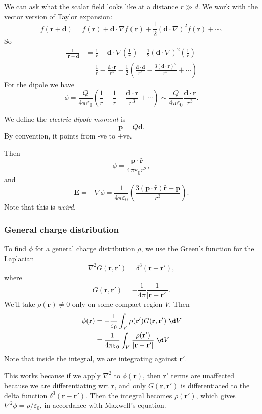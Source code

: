 \documentclass[a4paper]{article}
\begin{document}
We can ask what the scalar field looks like at a distance $r \gg d$. We work with the vector version of Taylor expansion:
\[
  f(\mathbf{r} + \mathbf{d}) = f(\mathbf{r}) + \mathbf{d}\cdot \nabla f(\mathbf{r}) + \frac{1}{2}(\mathbf{d}\cdot \nabla)^2f(\mathbf{r}) + \cdots.
\]
So
\begin{align*}
  \frac{1}{|\mathbf{r} + \mathbf{d}} &= \frac{1}{r} - \mathbf{d}\cdot \nabla\left(\frac{1}{r}\right) + \frac{1}{2}(\mathbf{d}\cdot \nabla)^2\left(\frac{1}{r}\right)\\
  &= \frac{1}{r} - \frac{\mathbf{d}\cdot \mathbf{r}}{r^3} - \frac{1}{2}\left(\frac{\mathbf{d}\cdot \mathbf{d}}{r^3} - \frac{3(\mathbf{d}\cdot \mathbf{r})^2}{r^5} + \cdots\right)
\end{align*}
For the dipole we have
\[
  \phi = \frac{Q}{4\pi\varepsilon_0}\left(\frac{1}{r} - \frac{1}{r} + \frac{\mathbf{d}\cdot \mathbf{r}}{r^3} + \cdots\right) \sim \frac{Q}{4\pi\varepsilon_0} \frac{\mathbf{d}\cdot \mathbf{r}}{r^3}.
\]
\begin{defi}
  We define the \emph{electric dipole moment} is
  \[
    \mathbf{p} = Q\mathbf{d}.
  \]
  By convention, it points from -ve to +ve.
\end{defi}
Then
\[
  \phi = \frac{\mathbf{p}\cdot \hat{\mathbf{r}}}{4\pi\varepsilon_0 r^2},
\]
and
\[
  \mathbf{E} = -\nabla\phi = \frac{1}{4\pi\varepsilon_0}\left(\frac{3(\mathbf{p}\cdot\hat{\mathbf{r}})\hat{\mathbf{r}} - \mathbf{p}}{r^3}\right).
\]
Note that this is \emph{weird}.

\subsubsection{General charge distribution}
To find $\phi$ for a general charge distribution $\rho$, we use the Green's function for the Laplacian
\[
  \nabla^2 G(\mathbf{r}, \mathbf{r}') = \delta^3(\mathbf{r} - \mathbf{r}'),
\]
where
\[
  G(\mathbf{r}, \mathbf{r}') = -\frac{1}{4\pi}\frac{1}{|\mathbf{r} - \mathbf{r}'|}.
\]
We'll take $\rho(\mathbf{r})\not= 0$ only on some compact region $V$. Then
\begin{align*}
  \phi(\mathbf{r}) &= -\frac{1}{\varepsilon_0}\int_V \rho(\mathbf{r}') G(\mathbf{r}, \mathbf{r}')\;\d V\\
  &= \frac{1}{4\pi\varepsilon_0}\int_V \frac{\rho(\mathbf{r}')}{|\mathbf{r} - \mathbf{r}'|}\;\d V
\end{align*}
Note that inside the integral, we are integrating against $\mathbf{r}'$.

This works because if we apply $\nabla^2$ to $\phi(\mathbf{r})$, then $\mathbf{r}'$ terms are unaffected because we are differentiating wrt $\mathbf{r}$, and only $G(\mathbf{r}, \mathbf{r}')$ is differentiated to the delta function $\delta^3(\mathbf{r} - \mathbf{r}')$. Then the integral becomes $\rho(\mathbf{r}')$, which gives $\nabla^2 \phi = \rho/\varepsilon_0$, in accordance with Maxwell's equation.
\end{document}
